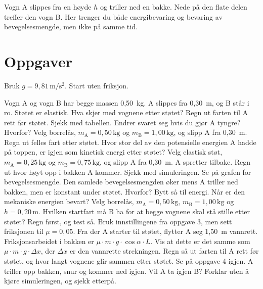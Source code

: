 \documentclass[11pt]{article}
\begin{document}

Vogn A slippes fra en høyde $h$ og triller ned en bakke. Nede på den flate delen treffer den vogn B. Her trenger du både energibevaring og bevaring av bevegelsesmengde, men ikke på samme tid.

\section*{Oppgaver}

Bruk $g = 9{,}81\,\mathrm{m/s^{2}}$. Start uten friksjon.

\begin{oppgaveliste}
\oppgave {}Vogn A og vogn B har begge massen 0,50~kg. A slippes fra 0,30~m, og B står i ro. Støtet er elastisk. Hva skjer med vognene etter støtet?
\svar
\oppgave {}Regn ut farten til A rett før støtet. Sjekk med tabellen. Endrer svaret seg hvis du gjør A tyngre? Hvorfor?
\svar
\oppgave {}Velg borrelås, $m_{\mathrm{A}} = 0{,}50\,\mathrm{kg}$ og $m_{\mathrm{B}} = 1{,}00\,\mathrm{kg}$, og slipp A fra 0,30~m. Regn ut felles fart etter støtet. Hvor stor del av den potensielle energien A hadde på toppen, er igjen som kinetisk energi etter støtet?
\svar
\oppgave {}Velg elastisk støt, $m_{\mathrm{A}} = 0{,}25\,\mathrm{kg}$ og $m_{\mathrm{B}} = 0{,}75\,\mathrm{kg}$, og slipp A fra 0,30~m. A spretter tilbake. Regn ut hvor høyt opp i bakken A kommer. Sjekk med simuleringen.
\svar
\oppgave {}Se på grafen for bevegelsesmengde. Den samlede bevegelsesmengden øker mens A triller ned bakken, men er konstant under støtet. Hvorfor? Bytt så til energi. Når er den mekaniske energien bevart?
\svar
\oppgave {}Velg borrelås, $m_{\mathrm{A}} = 0{,}50\,\mathrm{kg}$, $m_{\mathrm{B}} = 1{,}00\,\mathrm{kg}$ og $h = 0{,}20\,\mathrm{m}$. Hvilken startfart må B ha for at begge vognene skal stå stille etter støtet? Regn først, og test så.
\svar
\oppgave {}Bruk innstillingene fra oppgave 3, men sett friksjonen til $μ = 0{,}05$. Fra der A starter til støtet, flytter A seg 1,50~m vannrett. Friksjonsarbeidet i bakken er $μ \cdot m \cdot g \cdot \cos  α \cdot L$. Vis at dette er det samme som $μ \cdot m \cdot g \cdot Δx$, der $Δx$ er den vannrette strekningen. Regn så ut farten til A rett før støtet, og hvor langt vognene glir sammen etter støtet.
\svar
\oppgave {}Se på oppgave 4 igjen. A triller opp bakken, snur og kommer ned igjen. Vil A ta igjen B? Forklar uten å kjøre simuleringen, og sjekk etterpå.
\svar
\end{oppgaveliste}
\end{document}
